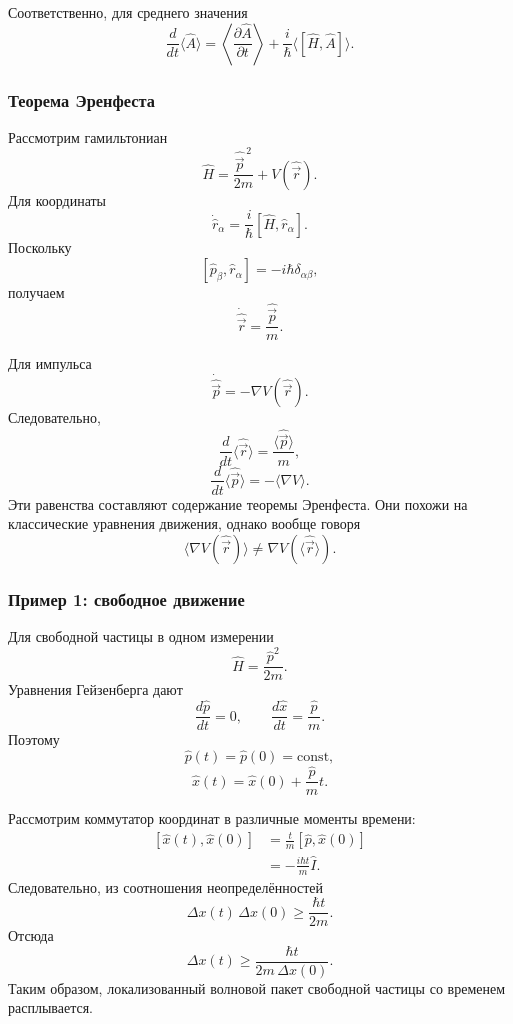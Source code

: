 \documentclass[12pt,a4paper]{article}
\begin{document}
Соответственно, для среднего значения
\[
    \boxed{
    \frac{d}{dt}
    \langle\hat A\rangle
    =
    \left\langle
        \frac{\partial\hat A}{\partial t}
    \right\rangle
    +
    \frac{i}{\hbar}
    \langle[\hat H,\hat A]\rangle
    }.
\]


\subsubsection{Теорема Эренфеста}

Рассмотрим гамильтониан
\[
    \boxed{
        \hat H
        =
        \frac{\hat{\vec p}^{\,2}}{2m}
        +
        V(\hat{\vec r})
    }.
\]
Для координаты
\[
    \dot{\hat r}_\alpha
    =
    \frac{i}{\hbar}
    [\hat H,\hat r_\alpha].
\]
Поскольку
\[
    [\hat p_\beta,\hat r_\alpha]
    =
    -i\hbar\delta_{\alpha\beta},
\]
получаем
\[
    \boxed{
        \dot{\hat{\vec r}}
        =
        \frac{\hat{\vec p}}{m}
    }.
\]

Для импульса
\[
    \boxed{
        \dot{\hat{\vec p}}
        =
        -\nabla V(\hat{\vec r})
    }.
\]
Следовательно,
\[
    \boxed{
        \frac{d}{dt}
        \langle\hat{\vec r}\rangle
        =
        \frac{\langle\hat{\vec p}\rangle}{m}
    },
\]
\[
    \boxed{
        \frac{d}{dt}
        \langle\hat{\vec p}\rangle
        =
        -\langle\nabla V\rangle
    }.
\]
Эти равенства составляют содержание теоремы Эренфеста. Они похожи на
классические уравнения движения, однако вообще говоря
\[
    \langle\nabla V(\hat{\vec r})\rangle
    \neq
    \nabla V(\langle\hat{\vec r}\rangle).
\]


\subsubsection{Пример 1: свободное движение}

Для свободной частицы в одном измерении
\[
    \hat H=\frac{\hat p^2}{2m}.
\]
Уравнения Гейзенберга дают
\[
    \frac{d\hat p}{dt}=0,
    \qquad
    \frac{d\hat x}{dt}
    =
    \frac{\hat p}{m}.
\]
Поэтому
\[
    \boxed{
        \hat p(t)=\hat p(0)=\mathrm{const}
    },
\]
\[
    \boxed{
        \hat x(t)
        =
        \hat x(0)
        +
        \frac{\hat p}{m}t
    }.
\]

Рассмотрим коммутатор координат в различные моменты времени:
\[
\begin{aligned}
    [\hat x(t),\hat x(0)]
    &=
    \frac{t}{m}
    [\hat p,\hat x(0)]
    \\
    &=
    -\frac{i\hbar t}{m}\hat I.
\end{aligned}
\]
Следовательно, из соотношения неопределённостей
\[
    \boxed{
        \Delta x(t)\,\Delta x(0)
        \geq
        \frac{\hbar t}{2m}
    }.
\]
Отсюда
\[
    \boxed{
        \Delta x(t)
        \geq
        \frac{\hbar t}
        {2m\,\Delta x(0)}
    }.
\]
Таким образом, локализованный волновой пакет свободной частицы со
временем расплывается.
\end{document}
